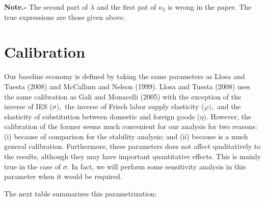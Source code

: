 \documentclass{article}
\begin{document}
\textbf{Note.-} The second part of $\lambda $ and the first pat of $\kappa
_{2}$ is wrong in the paper. The true expressions are those given above.

\section{Calibration}

Our baseline economy is defined by taking the same parameters as Llosa and
Tuesta (2008) and McCallum and Nelson (1999). Llosa and Tuesta (2008) uses
the same calibration as Gali and Monacelli (2005) with the exception of the
inverse of IES ($\sigma ),$ the inverse of Frisch labor supply elasticity ($%
\varphi ),$ and the elasticity of substitution between domestic and foreign
goods ($\eta ).$ However, the calibration of the former seems much
convenient for our analysis for two reasons: (i) because of comparison for
the stability analysis; and (ii) because is a much general calibration.
Furthermore, these parameters does not affect qualitatively to the results,
although they may have important quantitative effects. This is mainly true
in the case of $\sigma .$ In fact, we will perform some sensitivity analysis
in this parameter when it would be required.

The next table summarizes this parametrization:
\end{document}
